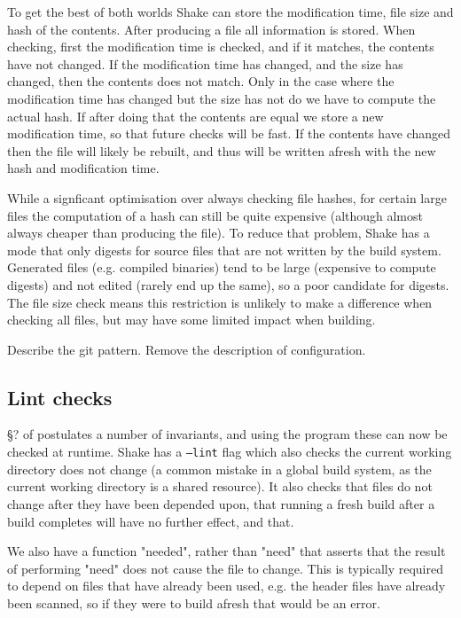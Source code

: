To get the best of both worlds Shake can store the modification time, file size and hash of the contents. After producing a file all information is stored. When checking, first the modification time is checked, and if it matches, the contents have not changed. If the modification time has changed, and the size has changed, then the contents does not match. Only in the case where the modification time has changed but the size has not do we have to compute the actual hash. If after doing that the contents are equal we store a new modification time, so that future checks will be fast. If the contents have changed then the file will likely be rebuilt, and thus will be written afresh with the new hash and modification time.

While a signficant optimisation over always checking file hashes, for certain large files the computation of a hash can still be quite expensive (although almost always cheaper than producing the file). To reduce that problem, Shake has a mode that only digests for source files that are not written by the build system. Generated files (e.g. compiled binaries) tend to be large (expensive to compute digests) and not edited (rarely end up the same), so a poor candidate for digests. The file size check means this restriction is unlikely to make a difference when checking all files, but may have some limited impact when building.

Describe the git pattern. Remove the description of configuration.

\subsection{Lint checks}

\S? of \cite{shake} postulates a number of invariants, and using the  program these can now be checked at runtime. Shake has a \texttt{--lint} flag which also checks the current working directory does not change (a common mistake in a global build system, as the current working directory is a shared resource). It also checks that files do not change after they have been depended upon, that running a fresh build after a build completes will have no further effect, and that.

We also have a function \lst"needed", rather than \lst"need" that asserts that the result of performing \lst"need" does not cause the file to change. This is typically required to depend on files that have already been used, e.g. the header files have already been scanned, so if they were to build afresh that would be an error.

